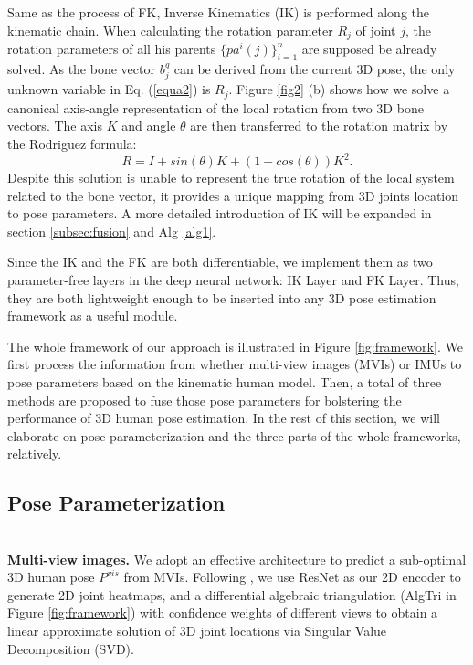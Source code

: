 \documentclass[lettersize,journal]{IEEEtran}
\begin{document}
Same as the process of FK, Inverse Kinematics (IK) is performed along the kinematic chain. When calculating the rotation parameter $R_{j}$ of joint $j$, the rotation parameters of all his parents $\lbrace pa^{i}(j) \rbrace_{i=1}^{n}$ are supposed be already solved. As the bone vector $b_{j}^{g}$ can be derived from the current 3D pose, the only unknown variable in Eq. (\ref{equa2}) is $R_{j}$. Figure \ref{fig2} (b) shows how we solve a canonical axis-angle representation of the local rotation from two 3D bone vectors. The axis $K$ and angle $\theta$ are then transferred to the rotation matrix by the Rodriguez formula: 
\begin{equation}
R = I + sin(\theta)K + (1-cos(\theta))K^{2}.
\end{equation}
Despite this solution is unable to represent the true rotation of the local system related to the bone vector, it provides a unique mapping from 3D joints location to pose parameters. A more detailed introduction of IK will be expanded in section \ref{subsec:fusion} and Alg \ref{alg1}.

Since the IK and the FK are both differentiable, we implement them as two parameter-free layers in the deep neural network: IK Layer and FK Layer. Thus, they are both lightweight enough to be inserted into any 3D pose estimation framework as a useful module.

The whole framework of our approach is illustrated in Figure \ref{fig:framework}. We first process the information from whether multi-view images (MVIs) or IMUs to pose parameters based on the kinematic human model. Then, a total of three methods are proposed to fuse those pose parameters for bolstering the performance of 3D human pose estimation. In the rest of this section, we will elaborate on pose parameterization and the three parts of the whole frameworks, relatively.

\subsection{Pose Parameterization}

~\\
\noindent \textbf{Multi-view images.}
\quad We adopt an effective architecture to predict a sub-optimal 3D human pose $P^{vis}$ from MVIs. Following \cite{iskakov2019learnable}, we use ResNet as our 2D encoder to generate 2D joint heatmaps, and a differential algebraic triangulation (AlgTri in Figure \ref{fig:framework}) with confidence weights of different views to obtain a linear approximate solution of 3D joint locations via Singular Value Decomposition (SVD). 
\end{document}
